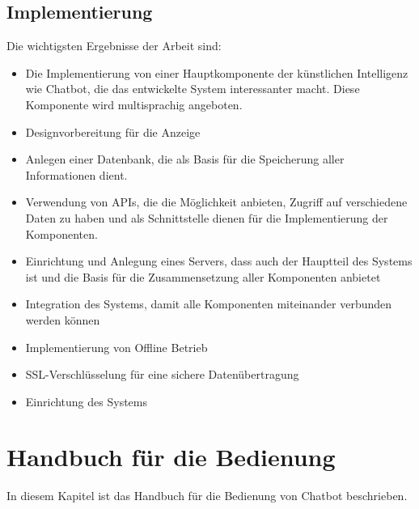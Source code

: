 \subsection{Implementierung}
Die wichtigsten Ergebnisse der Arbeit sind: 
\begin{itemize}
	\item Die Implementierung von einer Hauptkomponente der künstlichen Intelligenz wie Chatbot, die das entwickelte System interessanter macht. Diese Komponente wird multisprachig angeboten.
\end{itemize}
\begin{itemize}
	\item Designvorbereitung für die Anzeige
\end{itemize}
\begin{itemize}
	\item Anlegen einer Datenbank, die als Basis für die Speicherung aller Informationen dient.
\end{itemize}
\begin{itemize}
	\item Verwendung von APIs, die die Möglichkeit anbieten, Zugriff auf verschiedene Daten zu haben und als Schnittstelle dienen für die Implementierung der Komponenten.
\end{itemize}
\begin{itemize}
	\item 
	Einrichtung und Anlegung eines Servers, dass auch der Hauptteil des Systems ist und die Basis für die Zusammensetzung aller Komponenten anbietet
\end{itemize}
\begin{itemize}
	\item 
	Integration des Systems, damit alle Komponenten miteinander verbunden werden können
\end{itemize}
\begin{itemize}
	\item 
	Implementierung von Offline Betrieb
\end{itemize}
\begin{itemize}
	\item 
	SSL-Verschl\"usselung f\"ur eine sichere Daten\"ubertragung
\end{itemize}
\begin{itemize}
	\item 
	Einrichtung des Systems
\end{itemize}
\section{Handbuch für die Bedienung}
In diesem Kapitel ist das Handbuch für die Bedienung von Chatbot beschrieben.
